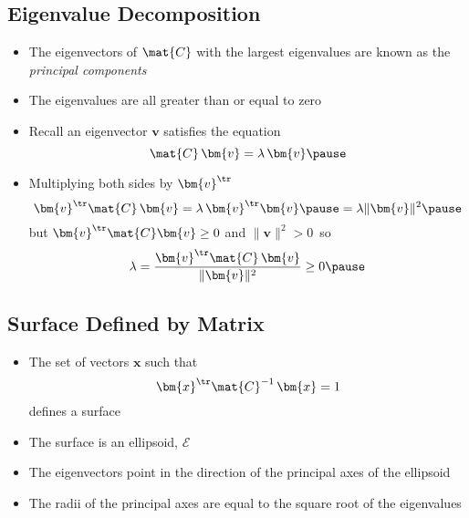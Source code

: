 
\begin{slide}
\section[-2]{Eigenvalue Decomposition}

\begin{PauseHighLight}

\begin{itemize}\squeeze
\item The eigenvectors of $\mat{C}$ with the largest eigenvalues are known
  as the \emph{principal components}\pause
\item The eigenvalues are all greater than or equal to zero\pause
\item Recall an eigenvector $\bm{v}$ satisfies the equation
  \begin{displaymath}
    \mat{C}\, \bm{v} = \lambda\, \bm{v}\pause
  \end{displaymath}
\item Multiplying both sides by $\bm{v}^\tr$\pause
  \begin{displaymath}
    \bm{v}^\tr \mat{C}\, \bm{v} = \lambda\, \bm{v}^\tr \bm{v}\pause
    = \lambda \|\bm{v}\|^2\pause
  \end{displaymath}
  but $\bm{v}^\tr \mat{C} \bm{v}\geq 0$ and $\|\bm{v}\|^2>0$\pause\ so
  \begin{displaymath}
    \lambda = \frac{\bm{v}^\tr \mat{C} \,\bm{v}}{\|\bm{v}\|^2} \geq 0\pause
  \end{displaymath}
\end{itemize}

\end{PauseHighLight}
\end{slide}


\begin{slide}
\section{Surface Defined by Matrix}

\begin{PauseHighLight}

\begin{itemize}
\item The set of vectors $\bm{x}$ such that
  \begin{displaymath}
    \bm{x}^\tr \mat{C}^{-1}\, \bm{x} = 1
  \end{displaymath}
defines a surface\pause
\item The surface is an ellipsoid, $\mathcal{E}$\pause
\item The eigenvectors point in the direction of the principal axes of the
  ellipsoid\pause
\item The radii of the principal axes are equal to the square root of
  the eigenvalues\pause
\end{itemize}


\end{PauseHighLight}
\end{slide}

